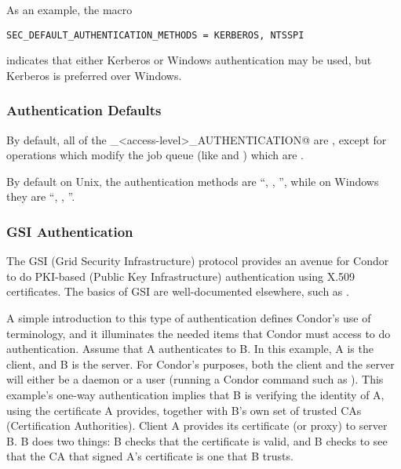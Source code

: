 As an example, the macro
\begin{verbatim}
SEC_DEFAULT_AUTHENTICATION_METHODS = KERBEROS, NTSSPI
\end{verbatim}
indicates that either Kerberos or Windows authentication may be used,
but Kerberos is preferred over Windows.

\subsubsection{Authentication Defaults}

By default, all of the \verb@SEC_<access-level>_AUTHENTICATION@ are
\verb@OPTIONAL@, except for operations which modify the job queue (like
 and ) which are \verb@REQUIRED@.

By default on Unix, the authentication methods are ``\verb@FS@, \verb@KERBEROS@,
\verb@GSI@'', while on Windows they are ``\verb@NTSSPI@, \verb@KERBEROS@, \verb@GSI@''. 

\subsubsection{\label{sec:GSI-Authentication}GSI Authentication}
The GSI (Grid Security Infrastructure) protocol provides
an avenue for Condor to do
PKI-based (Public Key Infrastructure) authentication using X.509
certificates. 
The basics of GSI are well-documented elsewhere, such as
. 

A simple introduction to this type of authentication
defines Condor's use of terminology,
and it illuminates the needed items that Condor must access to
do authentication.
Assume that 
A authenticates to B.
In this example, A is the client, and B is the server.
For Condor's purposes, both the client and the server
will either be a daemon
or a user (running a Condor command such as ).
This example's one-way authentication implies that B
is verifying the identity of A,
using the certificate A provides,
together with B's own set of trusted CAs (Certification Authorities).
Client A provides its certificate (or proxy) to server B.
B does two things:
B checks that the certificate is valid,
and B checks to see that the CA that signed A's certificate
is one that B trusts.

